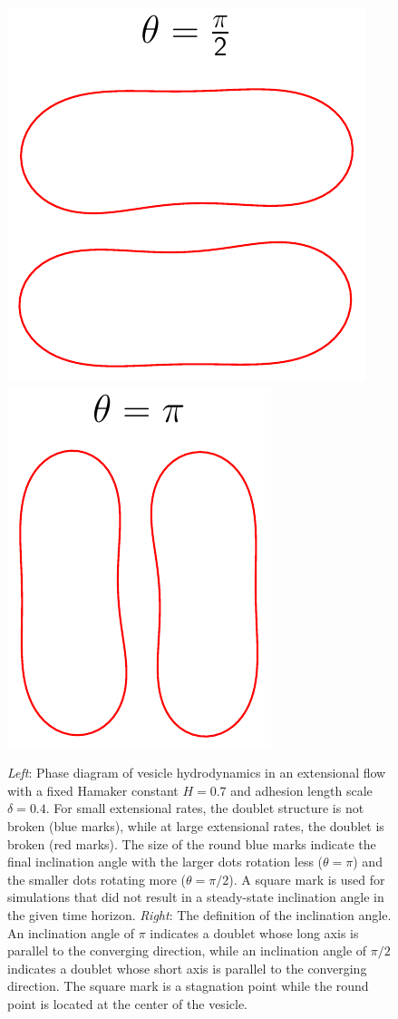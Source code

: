 \documentclass[prf,superscriptaddress,showpacs]{revtex4-1}
\begin{document}
\begin{figure}[htp]
\begin{minipage}{0.35\textwidth}
    \includegraphics[height=0.45\textwidth]{figs/rotate1.pdf}
    \hfill
    \includegraphics[height=0.45\textwidth]{figs/rotate2.pdf}
  \end{minipage}
  \caption{\label{fig:extensionalPhaseDiagram} {\em Left}: Phase diagram
  of vesicle hydrodynamics in an extensional flow with a fixed Hamaker
  constant $H=0.7$ and adhesion length scale $\delta = 0.4$.  For small
  extensional rates, the doublet structure is not broken (blue marks),
  while at large extensional rates, the doublet is broken (red marks).
  The size of the round blue marks indicate the final inclination angle
  with the larger dots rotation less ($\theta=\pi$) and the smaller dots
  rotating more ($\theta = \pi/2$).  A square mark is used for
  simulations that did not result in a steady-state inclination angle in
  the given time horizon.  {\em Right}: The definition of the
  inclination angle.  An inclination angle of $\pi$ indicates a doublet
  whose long axis is parallel to the converging direction, while an
  inclination angle of $\pi/2$ indicates a doublet whose short axis is
  parallel to the converging direction.  The square mark is a stagnation
  point while the round point is located at the center of the vesicle.}
\end{figure}
\end{document}
